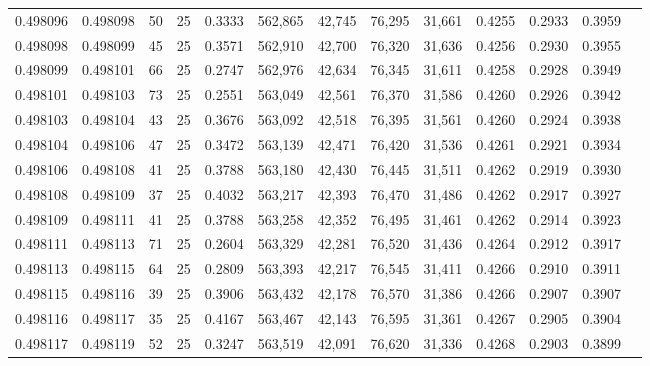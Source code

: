 \begin{tabular}{rrrrrrrrrrrrr}
0.498096 & 0.498098 &    50 &  25 &                                     0.3333 & 562,865 &  42,745 &  76,295 &  31,661 & 0.4255 & 0.2933 & 0.3959 \\
0.498098 & 0.498099 &    45 &  25 &                                     0.3571 & 562,910 &  42,700 &  76,320 &  31,636 & 0.4256 & 0.2930 & 0.3955 \\
0.498099 & 0.498101 &    66 &  25 &                                     0.2747 & 562,976 &  42,634 &  76,345 &  31,611 & 0.4258 & 0.2928 & 0.3949 \\
0.498101 & 0.498103 &    73 &  25 &                                     0.2551 & 563,049 &  42,561 &  76,370 &  31,586 & 0.4260 & 0.2926 & 0.3942 \\
0.498103 & 0.498104 &    43 &  25 &                                     0.3676 & 563,092 &  42,518 &  76,395 &  31,561 & 0.4260 & 0.2924 & 0.3938 \\
0.498104 & 0.498106 &    47 &  25 &                                     0.3472 & 563,139 &  42,471 &  76,420 &  31,536 & 0.4261 & 0.2921 & 0.3934 \\
0.498106 & 0.498108 &    41 &  25 &                                     0.3788 & 563,180 &  42,430 &  76,445 &  31,511 & 0.4262 & 0.2919 & 0.3930 \\
0.498108 & 0.498109 &    37 &  25 &                                     0.4032 & 563,217 &  42,393 &  76,470 &  31,486 & 0.4262 & 0.2917 & 0.3927 \\
0.498109 & 0.498111 &    41 &  25 &                                     0.3788 & 563,258 &  42,352 &  76,495 &  31,461 & 0.4262 & 0.2914 & 0.3923 \\
0.498111 & 0.498113 &    71 &  25 &                                     0.2604 & 563,329 &  42,281 &  76,520 &  31,436 & 0.4264 & 0.2912 & 0.3917 \\
0.498113 & 0.498115 &    64 &  25 &                                     0.2809 & 563,393 &  42,217 &  76,545 &  31,411 & 0.4266 & 0.2910 & 0.3911 \\
0.498115 & 0.498116 &    39 &  25 &                                     0.3906 & 563,432 &  42,178 &  76,570 &  31,386 & 0.4266 & 0.2907 & 0.3907 \\
0.498116 & 0.498117 &    35 &  25 &                                     0.4167 & 563,467 &  42,143 &  76,595 &  31,361 & 0.4267 & 0.2905 & 0.3904 \\
0.498117 & 0.498119 &    52 &  25 &                                     0.3247 & 563,519 &  42,091 &  76,620 &  31,336 & 0.4268 & 0.2903 & 0.3899 \\

\end{tabular}
